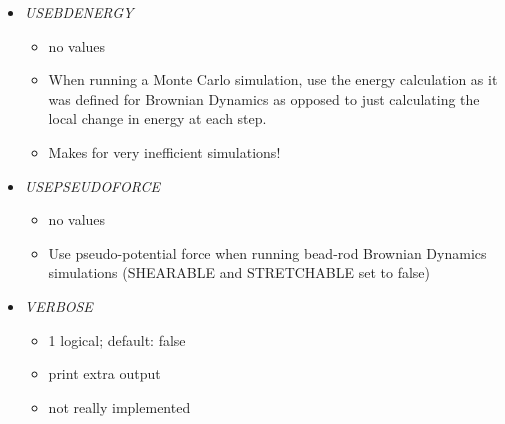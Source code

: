 \documentclass[12pt]{article}
\begin{document}
\begin{itemize}
%
\item {\it USEBDENERGY}
  \begin{itemize}
    \item no values
    \item When running a Monte Carlo simulation, use the energy calculation as it was defined for Brownian Dynamics as opposed to just calculating the local change in energy at each step.
    \item Makes for very inefficient simulations!
   \end{itemize}
%
\item {\it USEPSEUDOFORCE}
  \begin{itemize}
    \item no values
    \item Use pseudo-potential force when running bead-rod Brownian Dynamics simulations (SHEARABLE and STRETCHABLE set to false)
  \end{itemize}
%
\item {\it VERBOSE}
  \begin{itemize}
    \item 1 logical; default: false
    \item print extra output
    \item not really implemented
  \end{itemize}
%

\end{itemize}

 

\end{document}
